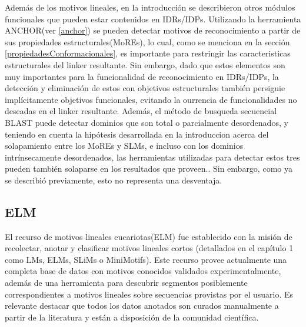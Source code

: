 Además de los motivos lineales, en la introducción se describieron otros módulos funcionales que pueden estar contenidos en IDRs/IDPs.
Utilizando la herramienta ANCHOR(ver \ref{anchor}) se pueden detectar motivos de reconocimiento a partir de sus propiedades estructurales(MoREs), lo cual, como se menciona en la sección \ref{propiedadesConformacionales}, 
es importante para restringir las caracteristicas estructurales del linker resultante. Sin embargo, dado que estos elementos son muy importantes para la funcionalidad de reconocimiento en IDRs/IDPs, la detección y 
eliminación de estos con objetivos estructurales también persiguie implícitamente objetivos funcionales, evitando la ourrencia de funcionalidades no deseadas en el linker resultante.
Además, el método de busqueda secuencial BLAST puede detectar dominios que son total o parcialmente desordenados, y teniendo en cuenta la hipótesis desarrollada en la introduccion acerca 
del solapamiento entre los MoREs y SLMs, e incluso con los dominios intrínsecamente desordenados, las herramientas utilizadas para detectar estos tres pueden también solaparse en los resultados que proveen.. 
Sin embargo, como ya se describió previamente, esto no representa una desventaja.








\subsection{ELM}\label{elm}

El recurso de motivos lineales eucariotas(ELM) \cite{puntervoll2003elm,dinkel2013eukaryotic} fue establecido con la misión de recolectar, anotar y clasificar motivos lineales cortos
(detallados en el capítulo 1 como LMs, ELMs, SLiMs o MiniMotifs). 
Este recurso provee actualmente una completa base de datos con motivos conocidos validados experimentalmente, además de una herramienta 
para descubrir segmentos posiblemente correspondientes a motivos lineales sobre secuencias provistas por el usuario. 
Es relevante destacar que todos los datos anotados son curados manualmente a partir de la literatura y están a disposición de la comunidad científica.

